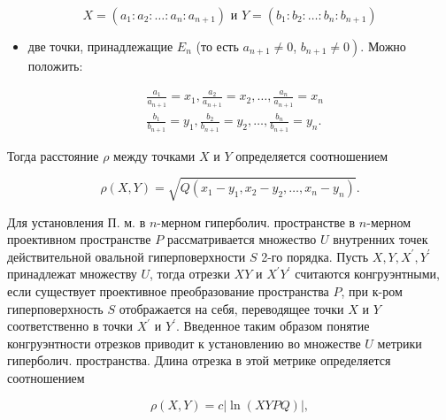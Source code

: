 \documentclass[10pt]{article}
\begin{document}
\[

X=\left(a_{1}: a_{2}: \ldots: a_{n}: a_{n+1}\right) \text { и } Y=\left(b_{1}: b_{2}: \ldots: b_{n}: b_{n+1}\right)

\]



\begin{itemize}

  \item две точки, принадлежащие $E_{n}$ (то есть $a_{n+1} \neq 0$, $\left.b_{n+1} \neq 0\right)$. Можно положить:

\end{itemize}



\[

\begin{aligned}

& \frac{a_{1}}{a_{n+1}}=x_{1}, \frac{a_{2}}{a_{n+1}}=x_{2}, \ldots, \frac{a_{n}}{a_{n+1}}=x_{n} \\

& \frac{b_{1}}{b_{n+1}}=y_{1}, \frac{b_{2}}{b_{n+1}}=y_{2}, \ldots, \frac{b_{n}}{b_{n+1}}=y_{n} .

\end{aligned}

\]



Тогда расстояние $\rho$ между точками $X$ и $Y$ определяется соотношением



\[

\rho(X, Y)=\sqrt{Q\left(x_{1}-y_{1}, x_{2}-y_{2}, \ldots, x_{n}-y_{n}\right)} .

\]



Для установления П. м. в $n$-мерном гиперболич. пространстве в $n$-мерном проективном пространстве $P$ рассматривается множество $U$ внутренних точек действительной овальной гиперповерхности $S$ 2-го порядка. Пусть $X, Y, X^{\prime}, Y^{\prime}$ принадлежат множеству $U$, тогда отрезки $X Y$ и $X^{\prime} Y^{\prime}$ считаются конгруэнтными, если существует проективное преобразование пространства $P$, при к-ром гиперповерхность $S$ отображается на себя, переводящее точки $X$ и $Y$ соответственно в точки $X^{\prime}$ и $Y^{\prime}$. Введенное таким образом понятие конгруэнтности отрезков приводит к установлению во множестве $U$ метрики гиперболич. пространства. Длина отрезка в этой метрике определяется соотношением



\[

\rho(X, Y)=c|\ln (X Y P Q)|,

\]
\end{document}
